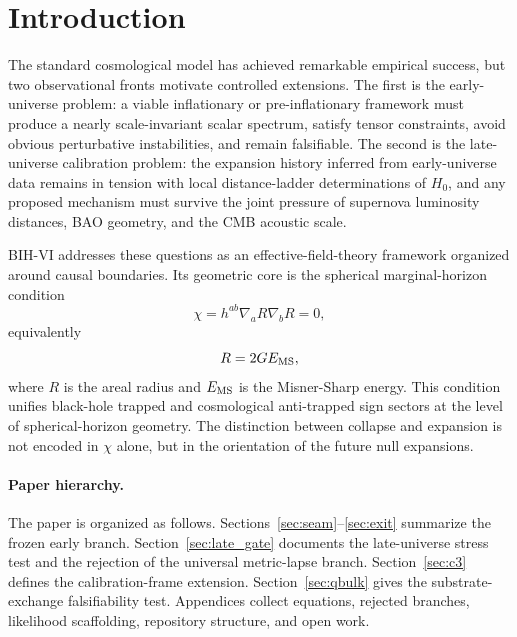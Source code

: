 \documentclass[11pt]{article}
\begin{document}
\noindent{}

\tableofcontents
\newpage

\section{Introduction}
The standard cosmological model has achieved remarkable empirical success, but two observational fronts motivate controlled extensions. The first is the early-universe problem: a viable inflationary or pre-inflationary framework must produce a nearly scale-invariant scalar spectrum, satisfy tensor constraints, avoid obvious perturbative instabilities, and remain falsifiable. The second is the late-universe calibration problem: the expansion history inferred from early-universe data remains in tension with local distance-ladder determinations of $H_0$, and any proposed mechanism must survive the joint pressure of supernova luminosity distances, BAO geometry, and the CMB acoustic scale.

BIH-VI addresses these questions as an effective-field-theory framework organized around causal boundaries. Its geometric core is the spherical marginal-horizon condition
\begin{equation}
\chi=h^{ab}\nabla_aR\nabla_bR=0,
\end{equation}
equivalently
\begin{equation}
R=2GE_{\rm MS},
\end{equation}
where $R$ is the areal radius and $E_{\rm MS}$ is the Misner-Sharp energy. This condition unifies black-hole trapped and cosmological anti-trapped sign sectors at the level of spherical-horizon geometry. The distinction between collapse and expansion is not encoded in $\chi$ alone, but in the orientation of the future null expansions.

\paragraph{Paper hierarchy.} The paper is organized as follows. Sections~\ref{sec:seam}--\ref{sec:exit} summarize the frozen early branch. Section~\ref{sec:late_gate} documents the late-universe stress test and the rejection of the universal metric-lapse branch. Section~\ref{sec:c3} defines the calibration-frame extension. Section~\ref{sec:qbulk} gives the substrate-exchange falsifiability test. Appendices collect equations, rejected branches, likelihood scaffolding, repository structure, and open work.
\end{document}
